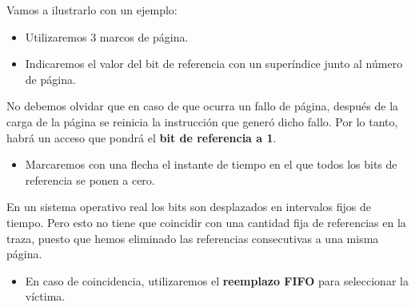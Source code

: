 Vamos a ilustrarlo con un ejemplo:

\begin{itemize}
\item
  Utilizaremos 3 marcos de página.
\item
  Indicaremos el valor del bit de referencia con un superíndice junto al
  número de página.
\end{itemize}

No debemos olvidar que en caso de que ocurra un fallo de página, después
de la carga de la página se reinicia la instrucción que generó dicho
fallo. Por lo tanto, habrá un acceso que pondrá el \textbf{bit de
referencia a 1}.

\begin{itemize}
\item
  Marcaremos con una flecha el instante de tiempo en el que todos los
  bits de referencia se ponen a cero.
\end{itemize}

En un sistema operativo real los bits son desplazados en intervalos
fijos de tiempo. Pero esto no tiene que coincidir con una cantidad fija
de referencias en la traza, puesto que hemos eliminado las referencias
consecutivas a una misma página.

\begin{itemize}
\item
  En caso de coincidencia, utilizaremos el \textbf{reemplazo FIFO} para
  seleccionar la víctima.
\end{itemize}

